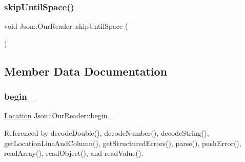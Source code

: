\mbox{\label{classJson_1_1OurReader_ad48bdaf5b686706f003e792fdbcbf102_ad48bdaf5b686706f003e792fdbcbf102}} 
\subsubsection{\texorpdfstring{skip\+Until\+Space()}{skipUntilSpace()}}
{\footnotesize\ttfamily void Json\+::\+Our\+Reader\+::skip\+Until\+Space (\begin{DoxyParamCaption}{ }\end{DoxyParamCaption})\hspace{0.3cm}{\ttfamily [private]}}



\subsection{Member Data Documentation}
\mbox{\label{classJson_1_1OurReader_a9bda9d72335d52cd06e65f9eca3f70f5_a9bda9d72335d52cd06e65f9eca3f70f5}} 
\subsubsection{\texorpdfstring{begin\+\_\+}{begin\_}}
{\footnotesize\ttfamily \hyperlink{classJson_1_1OurReader_a1bdc7bbc52ba87cae6b19746f2ee0189_a1bdc7bbc52ba87cae6b19746f2ee0189}{Location} Json\+::\+Our\+Reader\+::begin\+\_\+\hspace{0.3cm}{\ttfamily [private]}}



Referenced by decode\+Double(), decode\+Number(), decode\+String(), get\+Location\+Line\+And\+Column(), get\+Structured\+Errors(), parse(), push\+Error(), read\+Array(), read\+Object(), and read\+Value().

\mbox{\label{classJson_1_1OurReader_a259f6ac988da2894bcafc670e42f73ad_a259f6ac988da2894bcafc670e42f73ad}} 
